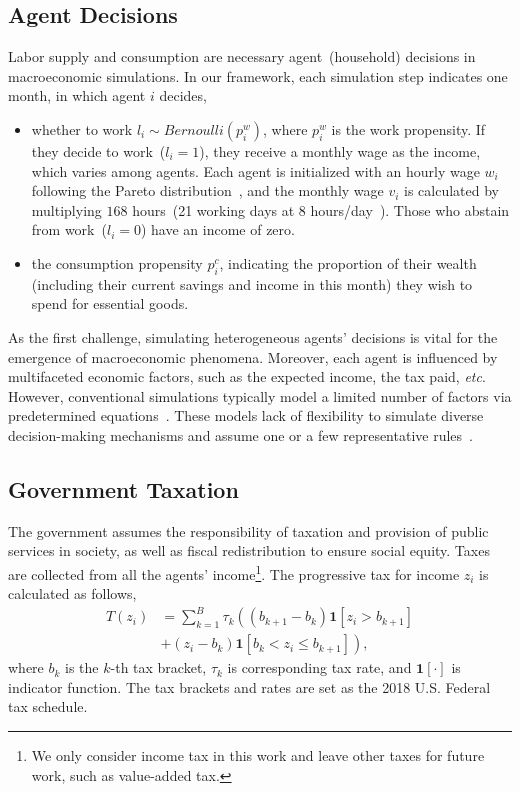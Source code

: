 \subsection{Agent Decisions}
Labor supply and consumption are necessary agent~(household) decisions in macroeconomic simulations. In our framework, each simulation step indicates one month, in which agent $i$ decides,
\begin{itemize}[leftmargin=*]
  
  \item whether to work $l_i\sim Bernoulli(p_i^w)$, where $p_i^w$ is the work propensity. If they decide to work~($l_i=1$), they receive a monthly wage as the income, which varies among agents. Each agent is initialized with an hourly wage $w_i$ following the Pareto distribution~\cite{zheng2022ai}, and the monthly wage $v_i$ is calculated by multiplying $168$ hours~(21 working days at 8 hours/day~\cite{lengnick2013agent}). Those who abstain from work~($l_i=0$) have an income of zero.
  \item the consumption propensity $p_i^c$, indicating the proportion of their wealth (including their current savings and income in this month) they wish to spend for essential goods.

\end{itemize}
As the first challenge, simulating heterogeneous agents' decisions is vital for the emergence of macroeconomic phenomena. Moreover, each agent is influenced by multifaceted economic factors, such as the expected income, the tax paid, \textit{etc}. However, conventional simulations typically model a limited number of factors via predetermined equations~\cite{lengnick2013agent,gatti2011macroeconomics,wolf2013multi}. These models lack of flexibility to simulate diverse decision-making mechanisms and assume one or a few representative rules~\cite{axtell2022agent}. 

\subsection{Government Taxation}
The government assumes the responsibility of taxation and provision of public services in society, as well as fiscal redistribution to ensure social equity. Taxes are collected from all the agents' income\footnote{We only consider income tax in this work and leave other taxes for future work, such as value-added tax.}. The progressive tax for income $z_i$ is calculated as follows,
\begin{align}
    T(z_i) &= \sum_{k=1}^{B} \tau_{k}\left(\left(b_{k+1}-b_{k}\right) \mathbf{1}\left[z_i>b_{k+1}\right]\right. \nonumber \\
    &\left.+\left(z_i-b_{k}\right) \mathbf{1}\left[b_{k}<z_i \leq b_{k+1}\right]\right),
\end{align}
where $b_k$ is the $k$-th tax bracket, $\tau_k$ is corresponding tax rate, and $\mathbf{1}[\cdot]$ is indicator function. The tax brackets and rates are set as the 2018 U.S. Federal tax schedule.

